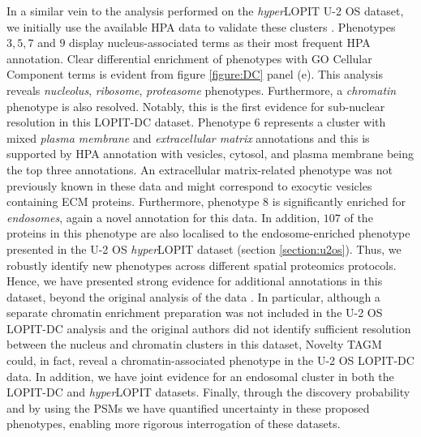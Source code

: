 \documentclass[12pt,english]{article}
\begin{document}
In a similar vein to the analysis performed on the \textit{hyper}LOPIT U-2 OS dataset, we initially use the available HPA data to validate these clusters \citep{Thul:2017}. Phenotypes $3,5,7$ and $9$ display nucleus-associated terms as their most frequent HPA annotation. Clear differential enrichment of phenotypes with GO Cellular Component terms is evident from figure \ref{figure:DC} panel (e). This analysis reveals \textit{nucleolus}, \textit{ribosome}, \textit{proteasome} phenotypes. Furthermore, a \textit{chromatin} phenotype is also resolved. Notably, this is the first evidence for sub-nuclear resolution in this LOPIT-DC dataset. Phenotype $6$ represents a cluster with mixed \textit{plasma membrane} and \textit{extracellular matrix} annotations and this is supported by HPA annotation with vesicles, cytosol, and plasma membrane being the top three annotations. An extracellular matrix-related phenotype was not previously known in these data and might correspond to exocytic vesicles containing ECM proteins. Furthermore, phenotype $8$ is significantly enriched for \textit{endosomes}, again a novel annotation for this data. In addition, $107$ of the proteins in this phenotype are also localised to the endosome-enriched phenotype presented in the U-2 OS \textit{hyper}LOPIT dataset (section \ref{section:u2os}). Thus, we robustly identify new phenotypes across different spatial proteomics protocols. Hence, we have presented strong evidence for additional annotations in this dataset, beyond the original analysis of the data \citep{DC:2018}. In particular, although a separate chromatin enrichment preparation was not included in the U-2 OS LOPIT-DC analysis and the original authors did not identify sufficient resolution between the nucleus and chromatin clusters in this dataset, Novelty TAGM could, in fact, reveal a chromatin-associated phenotype in the U-2 OS LOPIT-DC data. In addition, we have joint evidence for an endosomal cluster in both the LOPIT-DC and \textit{hyper}LOPIT datasets. Finally, through the discovery probability and by using the PSMs we have quantified uncertainty in these proposed phenotypes, enabling more rigorous interrogation of these datasets.


 
\end{document}

